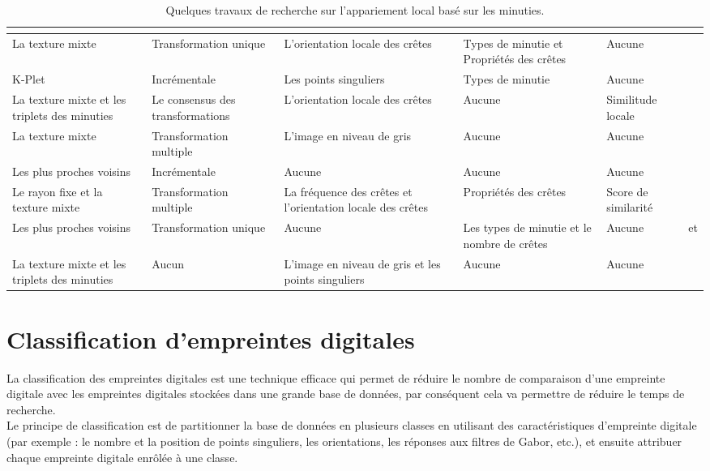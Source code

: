 \begin{sidewaystable}[h!]
\begin{tabular}{|p{4cm}|p{4cm}|p{4cm}|p{3cm}|p{3cm}|p{4cm}|}
\begin{center}
\begin{center}
			\end{center}
		\end{center} \\ \hline
		La texture mixte & Transformation unique & 
		L'orientation locale des crêtes
		& Types de minutie et Propriétés des crêtes & Aucune & \citep{he2003image} \\ \hline
		K-Plet & Incrémentale & Les points singuliers & Types de minutie & Aucune & \citep{chikkerur2005impact} \\ \hline
		La texture mixte et les triplets des minuties & Le consensus des transformations & L'orientation locale des crêtes & Aucune & Similitude locale & \citep{chen2006algorithm} \\ \hline
		La texture mixte & Transformation multiple & L'image en niveau de gris & Aucune & Aucune & \citep{benhammadi2007fingerprint} \\ \hline
		Les plus proches voisins & Incrémentale & Aucune & Aucune & Aucune & \citep{Watson2010} \\ \hline
		Le rayon fixe et la texture mixte & Transformation multiple & La fréquence des crêtes et l'orientation locale des crêtes & Propriétés des crêtes & Score de similarité & \citep{cao2009fingerprint} \\ \hline
		Les plus proches voisins & Transformation unique & Aucune & Les types de minutie et le nombre de crêtes & Aucune & \citep{jiang2000fingerprint} et \citep{bengueddoudj2013improving} \\ \hline
		La texture mixte et les triplets des minuties & Aucun & L'image en niveau de gris et les points singuliers & Aucune & Aucune & \citep{mistry2013fusion} \\ \hline
	\end{tabular}
	\caption{Quelques travaux de recherche sur l'appariement local basé sur les minuties.}%
\label{tab:chapitre2fingermatching}	
\end{sidewaystable}
\clearpage
\section{Classification d'empreintes digitales}
\label{fingerprintclassification}
La classification des empreintes digitales est une technique efficace qui permet de réduire le nombre de comparaison d'une empreinte digitale avec les empreintes digitales stockées dans une grande base de données, par conséquent cela va permettre de réduire le temps de recherche.
\\ Le principe de classification est de partitionner la base de données en plusieurs classes en utilisant des caractéristiques d'empreinte digitale (par exemple : le nombre et la position de points singuliers, les orientations, les réponses aux filtres de Gabor, etc.), et ensuite attribuer chaque empreinte digitale enrôlée à une classe.  \\
